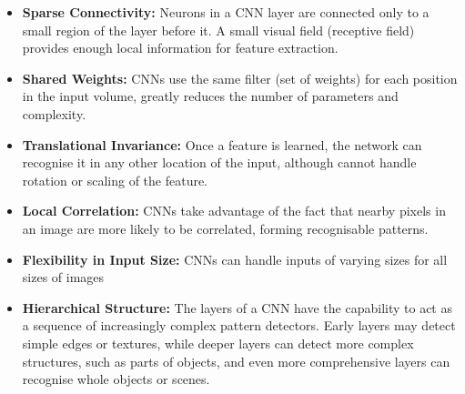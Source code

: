 \begin{itemize}
    \item \textbf{Sparse Connectivity:} Neurons in a CNN layer are connected only to a small region of the layer before it. A small visual field (receptive field) provides enough local information for feature extraction.
    \item \textbf{Shared Weights:} CNNs use the same filter (set of weights) for each position in the input volume, greatly reduces the number of parameters and complexity.
    \item \textbf{Translational Invariance:} Once a feature is learned, the network can recognise it in any other location of the input, although cannot handle rotation or scaling of the feature.
    \item \textbf{Local Correlation:} CNNs take advantage of the fact that nearby pixels in an image are more likely to be correlated, forming recognisable patterns.
    \item \textbf{Flexibility in Input Size:} CNNs can handle inputs of varying sizes for all sizes of images
    \item \textbf{Hierarchical Structure:} The layers of a CNN have the capability to act as a sequence of increasingly complex pattern detectors. Early layers may detect simple edges or textures, while deeper layers can detect more complex structures, such as parts of objects, and even more comprehensive layers can recognise whole objects or scenes.


\end{itemize}
